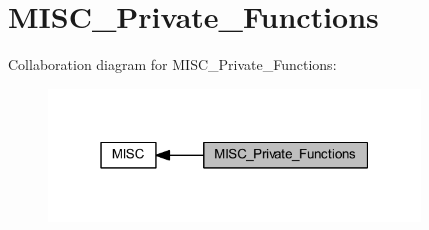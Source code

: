 \hypertarget{group___m_i_s_c___private___functions}{}\section{M\+I\+S\+C\+\_\+\+Private\+\_\+\+Functions}
\label{group___m_i_s_c___private___functions}
Collaboration diagram for M\+I\+S\+C\+\_\+\+Private\+\_\+\+Functions\+:
\nopagebreak
\begin{figure}[H]
\begin{center}
\leavevmode
\includegraphics[width=280pt]{group___m_i_s_c___private___functions}
\end{center}
\end{figure}

